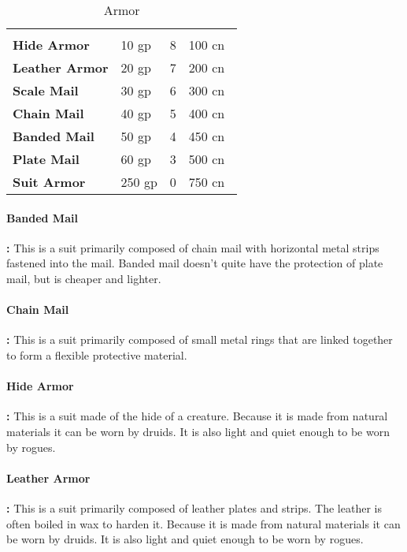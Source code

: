 \begin{multicols*}{2}
\begin {table}[H]
  \caption{Armor}
  \begin{tabularx}{\columnwidth}{>{\bfseries}YYYY}
		 &  &  & \\
		Hide Armor & 10 gp & 8 & 100 cn\\
		Leather Armor & 20 gp & 7 & 200 cn\\
		Scale Mail & 30 gp & 6 & 300 cn\\
		Chain Mail & 40 gp & 5 & 400 cn\\
		Banded Mail & 50 gp & 4 & 450 cn\\
		Plate Mail & 60 gp & 3 & 500 cn\\
		Suit Armor & 250 gp & 0 & 750 cn\
  \end {tabularx}
\end {table}

\paragraph{Banded Mail}\textbf{:} This is a suit primarily composed of chain mail with horizontal metal strips fastened into the mail. Banded mail doesn’t quite have the protection of plate mail, but is cheaper and lighter.

\paragraph{Chain Mail}\textbf{:} This is a suit primarily composed of small metal rings that are linked together to form a flexible protective material.

\paragraph{Hide Armor}\textbf{:} This is a suit made of the hide of a creature. Because it is made from natural materials it can be worn by druids. It is also light and quiet enough to be worn by rogues.

\paragraph{Leather Armor}\textbf{:} This is a suit primarily composed of leather plates and strips. The leather is often boiled in wax to harden it. Because it is made from natural materials it can be worn by druids. It is also light and quiet enough to be worn by rogues.


\end{multicols*}
